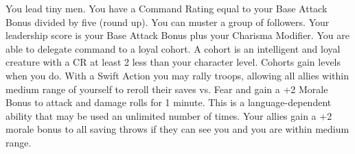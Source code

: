 {You lead tiny men.}
{You have a Command Rating equal to your Base Attack Bonus divided by five (round up).}
{You can muster a group of followers. Your leadership score is your Base Attack Bonus plus your Charisma Modifier.}
{You are able to delegate command to a loyal cohort. A cohort is an intelligent and loyal creature with a CR at least 2 less than your character level. Cohorts gain levels when you do.}
{With a Swift Action you may rally troops, allowing all allies within medium range of yourself to reroll their saves vs. Fear and gain a +2 Morale Bonus to attack and damage rolls for 1 minute. This is a language-dependent ability that may be used an unlimited number of times.}
{Your allies gain a +2 morale bonus to all saving throws if they can see you and you are within medium range.}